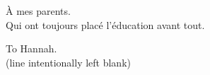 
\thispagestyle{empty}


\vspace*{3cm}


\bigskip

\begin{center}
    \`A mes parents. \\ \smallskip
    Qui ont toujours plac\'e l'\'education avant tout.
\end{center}

\bigskip

\begin{center}
   To Hannah. \\ \smallskip
   (line intentionally left blank)
\end{center}
